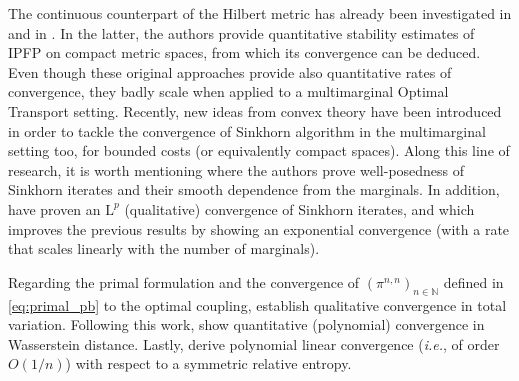 \documentclass[final,12pt]{colt2023} %
\def\ie{\textit{i.e.}}
\def\mrl{\mathrm{L}}
\def\nset{\mathbb{N}}
\def\ie{\textit{i.e.}}
\begin{document}
 The continuous counterpart of the Hilbert metric has already been investigated in \cite{chen2016hilbertmetric} and in \cite{deligiannidis2021quantitative}. In the latter, the authors provide quantitative stability estimates of IPFP on compact metric spaces, from which its convergence can be deduced. Even though these original approaches provide also quantitative rates of convergence, they badly scale when applied to a multimarginal Optimal Transport setting. Recently, new ideas from convex theory have been introduced in order to tackle the convergence of Sinkhorn algorithm in the multimarginal setting too, for bounded costs (or equivalently compact spaces). Along this line of research, it is worth mentioning \cite{carlier2020differential} where the authors prove well-posedness of Sinkhorn iterates and their smooth dependence from the marginals. In addition,  \cite{marinogerolin2020} have proven an $\mrl^p$ (qualitative) convergence of Sinkhorn iterates, and \cite{Carlier22multisink} which improves the previous results by showing an exponential convergence (with a rate that scales linearly with the number of marginals).   

Regarding the primal formulation and the convergence of $(\pi^{n,n})_{n \in\nset}$ defined in \eqref{eq:primal_pb} to the optimal coupling, \cite{NutzWiesel:qualitative:Sinkhorn} establish  qualitative convergence in total variation. Following this work, \cite{eckstein2021quantitative} show quantitative (polynomial) convergence in Wasserstein distance.  Lastly, \cite{ghosal2022nutz} derive  polynomial linear convergence (\ie, of order $O(1/n)$) with respect to a symmetric relative entropy.
\end{document}
